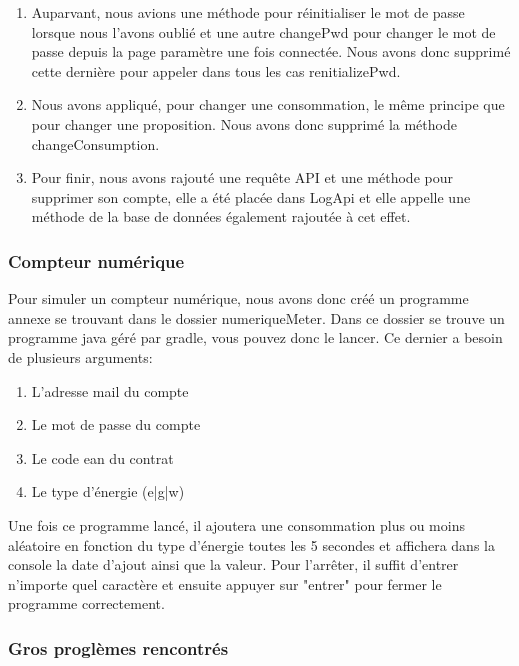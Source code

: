 \begin{enumerate}
\item Auparvant, nous avions une méthode pour réinitialiser le mot de passe lorsque nous l'avons oublié et une autre changePwd pour changer le mot de passe depuis la page paramètre une fois connectée. Nous avons donc supprimé cette dernière pour appeler dans tous les cas renitializePwd.
\item Nous avons appliqué, pour changer une consommation, le même principe que pour changer une proposition. Nous avons donc supprimé la méthode changeConsumption.
\item Pour finir, nous avons rajouté une requête API et une méthode pour supprimer son compte, elle a été placée dans LogApi et elle appelle une méthode de la base de données également rajoutée à cet effet.
\end{enumerate}

\subsubsection{Compteur numérique}

\begin{flushleft}
Pour simuler un compteur numérique, nous avons donc créé un programme annexe se trouvant dans le dossier numeriqueMeter. Dans ce dossier se trouve un programme java géré par gradle, vous pouvez donc le lancer. Ce dernier a besoin de plusieurs arguments:
\end{flushleft}

\begin{enumerate}[-]
\item L'adresse mail du compte
\item Le mot de passe du compte
\item Le code ean du contrat
\item Le type d'énergie (e|g|w)
\end{enumerate}

\begin{flushleft}
Une fois ce programme lancé, il ajoutera une consommation plus ou moins aléatoire en fonction du type d'énergie toutes les 5 secondes et affichera dans la console la date d'ajout ainsi que la valeur. Pour l'arrêter, il suffit d'entrer n'importe quel caractère et ensuite appuyer sur "entrer" pour fermer le programme correctement.
\end{flushleft}

\subsubsection{Gros proglèmes rencontrés}

